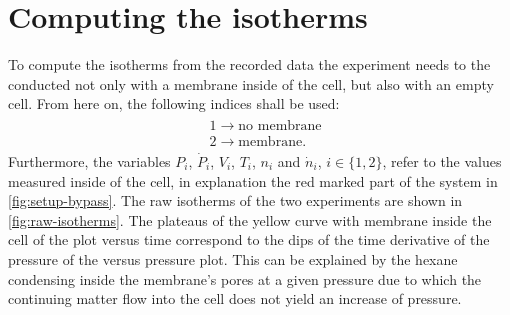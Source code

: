 \documentclass[../thesis.tex]{subfiles}
\begin{document}
    \section{Computing the isotherms}
    \label{sec:isotherm_computation}

        To compute the isotherms from the recorded data the experiment needs to the conducted not only with a membrane inside of the cell, but also with an empty cell. From here on, the following indices shall be used:
        \begin{align*}
            \begin{split}
                &1 \longrightarrow \textrm{no membrane} \\
                &2 \longrightarrow \textrm{membrane}.
                \label{eq:index_assignments}
            \end{split}
        \end{align*}
        Furthermore, the variables $P_i$, $\dot{P}_i$, $V_i$, $T_i$, $n_i$ and $\dot{n}_i$, $i\in \{1,2\}$, refer to the values measured inside of the cell, in explanation the red marked part of the system in \cref{fig:setup-bypass}. The raw isotherms of the two experiments are shown in \cref{fig:raw-isotherms}. The plateaus of the yellow curve with membrane inside the cell of the plot versus time  correspond to the dips of the time derivative of the pressure of the versus pressure plot. This can be explained by the hexane condensing inside the membrane's pores at a given pressure due to which the continuing matter flow into the cell does not yield an increase of pressure.
        \medskip

        
\end{document}
